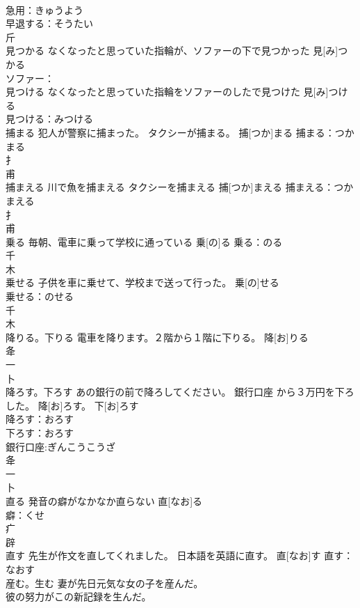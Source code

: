 \documentclass[8pt]{extreport}
\begin{document}
\begin{CJK}{UTF8}{min}
\\	急用：きゅうよう
\\	早退する：そうたい
\\	斤 
\\	見つかる	なくなったと思っていた指輪が、ソファーの下で見つかった	見[み]つかる			
\\	ソファー：
\\	見つける	なくなったと思っていた指輪をソファーのしたで見つけた	見[み]つける	
\\	見つける：みつける
\\	捕まる	犯人が警察に捕まった。 タクシーが捕まる。	捕[つか]まる			捕まる：つかまる
\\	扌 
\\	甫 
\\	捕まえる	川で魚を捕まえる タクシーを捕まえる	捕[つか]まえる			捕まえる：つかまえる
\\	扌 
\\	甫 
\\	乗る	毎朝、電車に乗って学校に通っている	乗[の]る			乗る：のる
\\	千 
\\	木 
\\	乗せる	子供を車に乗せて、学校まで送って行った。	乗[の]せる	
\\	乗せる：のせる
\\	千 
\\	木 
\\	降りる。下りる	電車を降ります。２階から１階に下りる。	降[お]りる					
\\	夅 
\\	一 
\\	卜 
\\	降ろす。下ろす	あの銀行の前で降ろしてください。 銀行口座 から３万円を下ろした。	降[お]ろす。 下[お]ろす	
\\	降ろす：おろす
\\	下ろす：おろす
\\	銀行口座:ぎんこうこうざ
\\	夅 
\\	一 
\\	卜 
\\	直る	発音の癖がなかなか直らない	直[なお]る	
\\	癖：くせ
\\	疒 
\\	辟 
\\	直す	先生が作文を直してくれました。 日本語を英語に直す。	直[なお]す			直す：なおす
\\	産む。生む	妻が先日元気な女の子を産んだ。 
\\	彼の努力がこの新記録を生んだ。 

\end{CJK}
\end{document}
